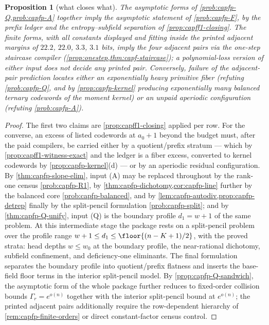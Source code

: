 \documentclass[11pt]{article}
\newtheorem{proposition}[proposition]{Proposition}
\theoremstyle{definition}
\theoremstyle{remark}
\begin{document}
\begin{proposition}[what closes what]\label{prop:capfp-closing}
The asymptotic forms of \cref{prob:capfp-Q,prob:capfp-A} together imply the asymptotic statement of \cref{prob:capfp-F}, by the prefix ledger and the entropy--subfield separation of \cref{prop:capff1-closing}.  The finite forms, with all constants displayed and fitting inside the printed adjacent margins of $22.2$, $22.0$, $3.3$, $3.1$ bits, imply the four adjacent pairs via the one-step staircase compiler \textup(\cref{prop:onestep,thm:capf-staircase}\textup); a polynomial-loss version of either input does not decide any printed pair.  Conversely, failure of the adjacent-pair prediction locates either an exponentially heavy primitive fiber \textup(refuting \cref{prob:capfp-Q}, and by \cref{prop:capfp-kernel} producing exponentially many balanced ternary codewords of the moment kernel\textup) or an unpaid aperiodic configuration \textup(refuting \cref{prob:capfp-A}\textup).
\end{proposition}

\begin{proof}
The first two claims are \cref{prop:capff1-closing} applied per row.  For the converse, an excess of listed codewords at $a_0+1$ beyond the budget must, after the paid compilers, be carried either by a quotient/prefix stratum --- which by \cref{prop:capff1-witness-exact} and the ledger is a fiber excess, converted to kernel codewords by \cref{prop:capfp-kernel}\textup{(d)} --- or by an aperiodic residual configuration.  By \cref{thm:capfp-slope-elim}, input \textup{(A)} may be replaced throughout by the rank-one census \cref{prob:capfp-R1}, by \cref{thm:capfp-dichotomy,cor:capfp-line} further by the balanced core \cref{prob:capfp-balanced}, and by \cref{lem:capfp-autodiv,prop:capfp-detrep} finally by the split-pencil formulation \cref{prob:capfp-split}; and by \cref{thm:capfp-Q-unify}, input \textup{(Q)} is the boundary profile $d_1=w+1$ of the same problem.  At this intermediate stage the package rests on a split-pencil problem over the profile range $w+1\le d_1\le\floor{(n-K+1)/2}$, with the proved strata: head depths $w\le w_0$ at the boundary profile, the near-rational dichotomy, subfield confinement, and deficiency-one eliminants.  The final formulation separates the boundary profile into quotient/prefix flatness and inserts the base-field floor terms in the interior split-pencil model.  By \cref{prop:capfp-Q-sandwich}, the asymptotic form of the whole package further reduces to fixed-order collision bounds $\Gamma_r=e^{o(n)}$ together with the interior split-pencil bound at $e^{o(n)}$; the printed adjacent pairs additionally require the row-dependent hierarchy of \cref{rem:capfp-finite-orders} or direct constant-factor census control.
\end{proof}
\end{document}

